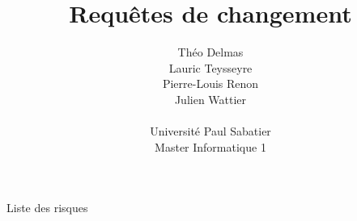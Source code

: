 \documentclass[]{article}
\title{Requêtes de changement}
\author{
    Théo Delmas\\
    Lauric Teysseyre\\
    Pierre-Louis Renon\\
    Julien Wattier\\
    \\
    Université Paul Sabatier\\
    Master Informatique 1\\
   }
\date{}
\begin{document}
\maketitle
\newpage
\tableofcontents
\newpage


\begin{section}{Liste des risques}




        


\end{section}
\end{document}
